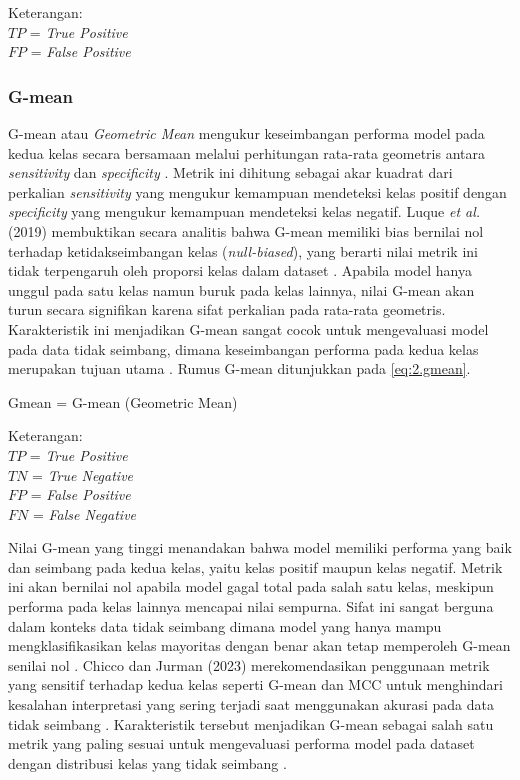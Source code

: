 Keterangan: \\
$TP$ = \textit{True Positive}\\
$FP$ = \textit{False Positive}

\subsubsection{G-mean} \label{II.gmean}
G-mean atau \textit{Geometric Mean} mengukur keseimbangan performa model pada kedua kelas secara bersamaan melalui perhitungan rata-rata geometris antara \textit{sensitivity} dan \textit{specificity} \cite{Luque2019Metrics}. Metrik ini dihitung sebagai akar kuadrat dari perkalian \textit{sensitivity} yang mengukur kemampuan mendeteksi kelas positif dengan \textit{specificity} yang mengukur kemampuan mendeteksi kelas negatif. Luque \textit{et al.} (2019) membuktikan secara analitis bahwa G-mean memiliki bias bernilai nol terhadap ketidakseimbangan kelas (\textit{null-biased}), yang berarti nilai metrik ini tidak terpengaruh oleh proporsi kelas dalam dataset \cite{Luque2019Metrics}. Apabila model hanya unggul pada satu kelas namun buruk pada kelas lainnya, nilai G-mean akan turun secara signifikan karena sifat perkalian pada rata-rata geometris. Karakteristik ini menjadikan G-mean sangat cocok untuk mengevaluasi model pada data tidak seimbang, dimana keseimbangan performa pada kedua kelas merupakan tujuan utama \cite{Luque2019Metrics}. Rumus G-mean ditunjukkan pada \ref{eq:2.gmean}.

\begin{equationcaptioned}[eq:2.gmean]{
    G\text{-}mean = 
}{
    G-mean (Geometric Mean)
}
\end{equationcaptioned}

Keterangan: \\
$TP$ = \textit{True Positive}\\
$TN$ = \textit{True Negative}\\
$FP$ = \textit{False Positive}\\
$FN$ = \textit{False Negative}

Nilai G-mean yang tinggi menandakan bahwa model memiliki performa yang baik dan seimbang pada kedua kelas, yaitu kelas positif maupun kelas negatif. Metrik ini akan bernilai nol apabila model gagal total pada salah satu kelas, meskipun performa pada kelas lainnya mencapai nilai sempurna. Sifat ini sangat berguna dalam konteks data tidak seimbang dimana model yang hanya mampu mengklasifikasikan kelas mayoritas dengan benar akan tetap memperoleh G-mean senilai nol \cite{Luque2019Metrics}. Chicco dan Jurman (2023) merekomendasikan penggunaan metrik yang sensitif terhadap kedua kelas seperti G-mean dan MCC untuk menghindari kesalahan interpretasi yang sering terjadi saat menggunakan akurasi pada data tidak seimbang \cite{Chicco2023MCC}. Karakteristik tersebut menjadikan G-mean sebagai salah satu metrik yang paling sesuai untuk mengevaluasi performa model pada dataset dengan distribusi kelas yang tidak seimbang \cite{Luque2019Metrics}.

